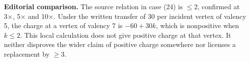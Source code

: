 \par\smallskip\noindent\leavevmode{}\label{GELFAND-P001456:case24-charge-inequality:editorial}{\footnotesize\textbf{Editorial comparison.} The source relation in case (24) is $\le2$, confirmed at 3×, 5× and 10×. Under the written transfer of 30 per incident vertex of valency 5, the charge at a vertex of valency 7 is $-60+30k$, which is nonpositive when $k\le2$. This local calculation does not give positive charge at that vertex. It neither disproves the wider claim of positive charge somewhere nor licenses a replacement by $\ge3$.\par}\smallskip
